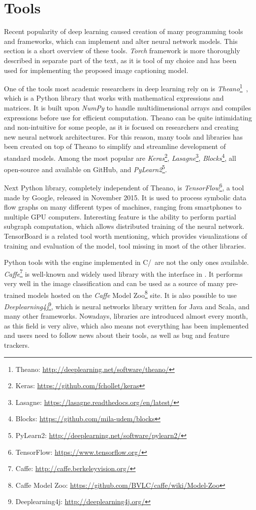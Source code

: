 \section{Tools}\label{sec:tools}

Recent popularity of deep learning caused creation of many programming tools and frameworks, which can implement and alter neural network models. This section is a short overview of these tools. \emph{Torch} framework is more thoroughly described in separate part of the text, as it is tool of my choice and has been used for implementing the proposed image captioning model.

One of the tools most academic researchers in deep learning rely on is \emph{Theano}\footnote{Theano: \url{http://deeplearning.net/software/theano/}}~\cite{bergstra-proc-scipy-2010}, which is a Python library that works with mathematical expressions and matrices. It is built upon \emph{NumPy} to handle multidimensional arrays and compiles expressions before use for efficient computation. Theano can be quite intimidating and non-intuitive for some people, as it is focused on researchers and creating new neural network architectures. For this reason, many tools and libraries has been created on top of Theano to simplify and streamline development of standard models. Among the most popular are \emph{Keras}\footnote{Keras: \url{https://github.com/fchollet/keras}}, \emph{Lasagne}\footnote{Lasagne: \url{https://lasagne.readthedocs.org/en/latest/}}, \emph{Blocks}\footnote{Blocks: \url{https://github.com/mila-udem/blocks}}, all open-source and available on GitHub, and \emph{PyLearn2}\footnote{PyLearn2: \url{http://deeplearning.net/software/pylearn2/}}.

Next Python library, completely independent of Theano, is \emph{TensorFlow}\footnote{TensorFlow: \url{https://www.tensorflow.org/}}, a tool made by Google, released in November 2015. It is used to process symbolic data flow graphs on many different types of machines, ranging from smartphones to multiple GPU computers. Interesting feature is the ability to perform partial subgraph computation, which allows distributed training of the neural network. TensorBoard is a related tool worth mentioning, which provides visualizations of training and evaluation of the model, tool missing in most of the other libraries.

Python tools with the engine implemented in C/\CC\ are not the only ones available. \emph{Caffe}\footnote{Caffe: \url{http://caffe.berkeleyvision.org/}} is well-known and widely used library with the interface in \CC. It performs very well in the image classification and can be used as a source of many pre-trained models hosted on the \emph{Caffe} Model Zoo\footnote{Caffe Model Zoo: \url{https://github.com/BVLC/caffe/wiki/Model-Zoo}} site. It is also possible to use \emph{Deeplearning4j}\footnote{Deeplearning4j: \url{http://deeplearning4j.org/}}, which is neural networks library written for Java and Scala, and many other frameworks. Nowadays, libraries are introduced almost every month, as this field is very alive, which also means not everything has been implemented and users need to follow news about their tools, as well as bug and feature trackers.

